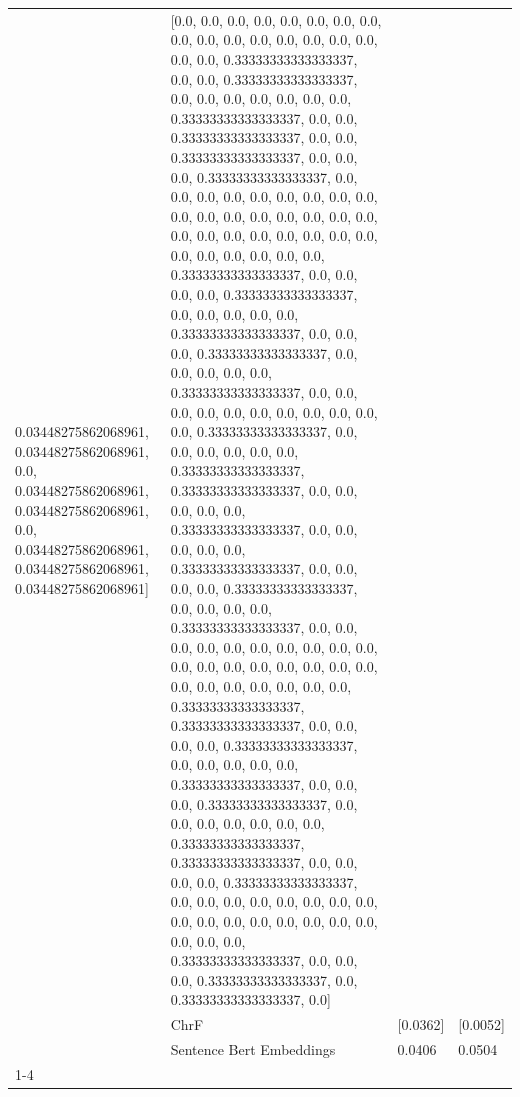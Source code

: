 \begin{tabular}{llll}
0.03448275862068961, 0.03448275862068961, 0.0, 0.03448275862068961, 0.03448275862068961, 0.0, 0.03448275862068961, 0.03448275862068961, 0.03448275862068961] & [0.0, 0.0, 0.0, 0.0, 0.0, 0.0, 0.0, 0.0, 0.0, 0.0, 0.0, 0.0, 0.0, 0.0, 0.0, 0.0, 0.0, 0.0, 0.33333333333333337, 0.0, 0.0, 0.33333333333333337, 0.0, 0.0, 0.0, 0.0, 0.0, 0.0, 0.0, 0.33333333333333337, 0.0, 0.0, 0.33333333333333337, 0.0, 0.0, 0.33333333333333337, 0.0, 0.0, 0.0, 0.33333333333333337, 0.0, 0.0, 0.0, 0.0, 0.0, 0.0, 0.0, 0.0, 0.0, 0.0, 0.0, 0.0, 0.0, 0.0, 0.0, 0.0, 0.0, 0.0, 0.0, 0.0, 0.0, 0.0, 0.0, 0.0, 0.0, 0.0, 0.0, 0.0, 0.0, 0.0, 0.0, 0.33333333333333337, 0.0, 0.0, 0.0, 0.0, 0.33333333333333337, 0.0, 0.0, 0.0, 0.0, 0.0, 0.33333333333333337, 0.0, 0.0, 0.0, 0.33333333333333337, 0.0, 0.0, 0.0, 0.0, 0.0, 0.33333333333333337, 0.0, 0.0, 0.0, 0.0, 0.0, 0.0, 0.0, 0.0, 0.0, 0.0, 0.0, 0.33333333333333337, 0.0, 0.0, 0.0, 0.0, 0.0, 0.0, 0.33333333333333337, 0.33333333333333337, 0.0, 0.0, 0.0, 0.0, 0.0, 0.33333333333333337, 0.0, 0.0, 0.0, 0.0, 0.0, 0.33333333333333337, 0.0, 0.0, 0.0, 0.0, 0.33333333333333337, 0.0, 0.0, 0.0, 0.0, 0.33333333333333337, 0.0, 0.0, 0.0, 0.0, 0.0, 0.0, 0.0, 0.0, 0.0, 0.0, 0.0, 0.0, 0.0, 0.0, 0.0, 0.0, 0.0, 0.0, 0.0, 0.0, 0.0, 0.0, 0.0, 0.0, 0.0, 0.33333333333333337, 0.33333333333333337, 0.0, 0.0, 0.0, 0.0, 0.33333333333333337, 0.0, 0.0, 0.0, 0.0, 0.0, 0.33333333333333337, 0.0, 0.0, 0.0, 0.33333333333333337, 0.0, 0.0, 0.0, 0.0, 0.0, 0.0, 0.0, 0.33333333333333337, 0.33333333333333337, 0.0, 0.0, 0.0, 0.0, 0.33333333333333337, 0.0, 0.0, 0.0, 0.0, 0.0, 0.0, 0.0, 0.0, 0.0, 0.0, 0.0, 0.0, 0.0, 0.0, 0.0, 0.0, 0.0, 0.0, 0.0, 0.33333333333333337, 0.0, 0.0, 0.0, 0.33333333333333337, 0.0, 0.33333333333333337, 0.0] \\
 & ChrF & [0.0362] & [0.0052] \\
 & Sentence Bert Embeddings & 0.0406 & 0.0504 \\
\cline{1-4}

\end{tabular}
